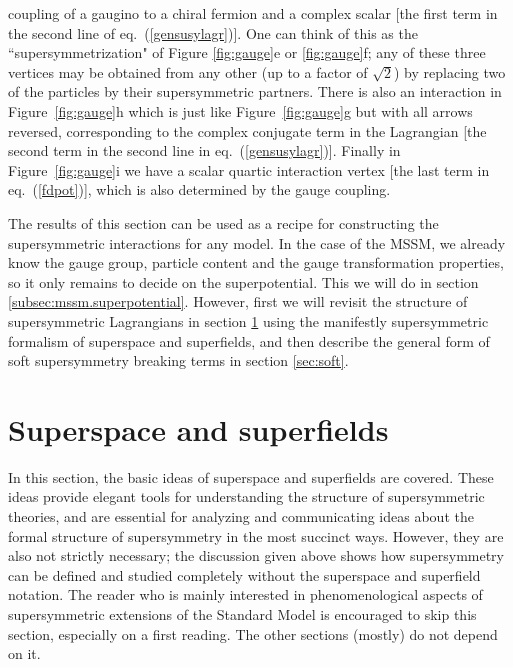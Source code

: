 \documentclass[11pt]{article}
\renewcommand{\theequation}{\arabic{section}.\arabic{equation}}
\begin{document}
coupling of a gaugino to a chiral fermion and a complex scalar [the first
term in the second line of eq.~(\ref{gensusylagr})]. One can think of this
as the ``supersymmetrization" of Figure \ref{fig:gauge}e or
\ref{fig:gauge}f; any of these three vertices may be obtained from any
other (up to a factor of ${\sqrt{2}}$) by replacing two of the particles
by their supersymmetric partners. There is also an interaction in
Figure~\ref{fig:gauge}h which is just like Figure~\ref{fig:gauge}g but
with all arrows reversed, corresponding to the complex conjugate term in
the Lagrangian [the second term in the second line in
eq.~(\ref{gensusylagr})]. Finally in Figure~\ref{fig:gauge}i we have a
scalar quartic interaction vertex [the last term in eq.~(\ref{fdpot})],
which is also determined by the gauge coupling. 

The results of this section can be used as a recipe for constructing the
supersymmetric interactions for any model. In the case of the MSSM, we
already know the gauge group, particle content and the gauge
transformation properties, so it only remains to decide on the
superpotential. This we will do in section
\ref{subsec:mssm.superpotential}. However, first we will revisit the structure of
supersymmetric Lagrangians in section \ref{sec:superfields} using the manifestly
supersymmetric formalism of superspace and superfields, and then describe the
general form of soft supersymmetry breaking terms in section \ref{sec:soft}.

\section{Superspace and superfields}\label{sec:superfields}
\setcounter{figure}{0}
\setcounter{table}{0}
\setcounter{footnote}{2}
\renewcommand{\theequation}{\arabic{section}.\arabic{subsection}.\arabic{equation}}

In this section, the basic ideas of superspace and superfields are covered. These ideas
provide elegant tools for understanding the structure of supersymmetric theories, and
are essential for analyzing and 
communicating ideas about the formal structure of supersymmetry
in the most succinct ways. However, they are also not strictly necessary; 
the discussion given above shows how supersymmetry can be defined and studied
completely without the superspace and superfield notation. The reader who is mainly 
interested in phenomenological aspects of supersymmetric extensions 
of the Standard Model is encouraged to skip this section, especially
on a first reading. The other sections (mostly) do not depend on it.
\end{document}
